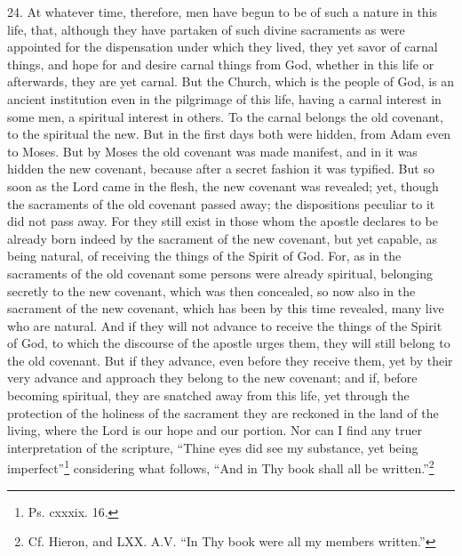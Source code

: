 24. At whatever time, therefore, men have begun to be of such a nature in this life, that, although they have partaken of such divine sacraments as were appointed for the dispensation under which they lived, they yet savor of carnal things, and hope for and desire carnal things from God, whether in this life or afterwards, they are yet carnal. But the Church, which is the people of God, is an ancient institution even in the pilgrimage of this life, having a carnal interest in some men, a spiritual interest in others. To the carnal belongs the old covenant, to the spiritual the new. But in the first days both were hidden, from Adam even to Moses. But by Moses the old covenant was made manifest, and in it was hidden the new covenant, because after a secret fashion it was typified. But so soon as the Lord came in the flesh, the new covenant was revealed; yet, though the sacraments of the old covenant passed away; the dispositions peculiar to it did not pass away. For they still exist in those whom the apostle declares to be already born indeed by the sacrament of the new covenant, but yet capable, as being natural, of receiving the things of the Spirit of God. For, as in the sacraments of the old covenant some persons were already spiritual, belonging secretly to the new covenant, which was then concealed, so now also in the sacrament of the new covenant, which has been by this time revealed, many live who are natural. And if they will not advance to receive the things of the Spirit of God, to which the discourse of the apostle urges them, they will still belong to the old covenant. But if they advance, even before they receive them, yet by their very advance and approach they belong to the new covenant; and if, before becoming spiritual, they are snatched away from this life, yet through the protection of the holiness of the sacrament they are reckoned in the land of the living, where the Lord is our hope and our portion. Nor can I find any truer interpretation of the scripture, ``Thine eyes did see my substance, yet being imperfect''\footnote{\par  Ps. cxxxix. 16.} considering what follows, ``And in Thy book shall all be written.''\footnote{\par  Cf. Hieron, and LXX. A.V. ``In Thy book were all my members written.''}


